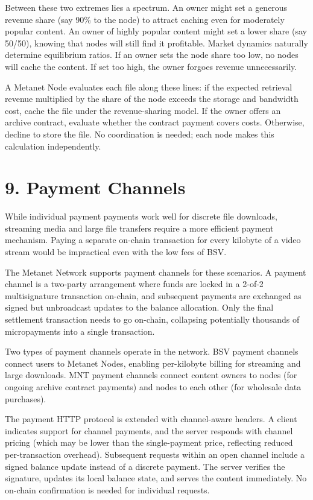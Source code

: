 \documentclass[11pt,a4paper]{article}
\begin{document}
Between these two extremes lies a spectrum. An owner might set a generous revenue share (say 90\% to the node) to attract caching even for moderately popular content. An owner of highly popular content might set a lower share (say 50/50), knowing that nodes will still find it profitable. Market dynamics naturally determine equilibrium ratios. If an owner sets the node share too low, no nodes will cache the content. If set too high, the owner forgoes revenue unnecessarily.

A Metanet Node evaluates each file along these lines: if the expected retrieval revenue multiplied by the share of the node exceeds the storage and bandwidth cost, cache the file under the revenue-sharing model. If the owner offers an archive contract, evaluate whether the contract payment covers costs. Otherwise, decline to store the file. No coordination is needed; each node makes this calculation independently.

\section{9. Payment Channels}

While individual payment payments work well for discrete file downloads, streaming media and large file transfers require a more efficient payment mechanism. Paying a separate on-chain transaction for every kilobyte of a video stream would be impractical even with the low fees of BSV.

The Metanet Network supports payment channels for these scenarios. A payment channel is a two-party arrangement where funds are locked in a 2-of-2 multisignature transaction on-chain, and subsequent payments are exchanged as signed but unbroadcast updates to the balance allocation. Only the final settlement transaction needs to go on-chain, collapsing potentially thousands of micropayments into a single transaction.

Two types of payment channels operate in the network. BSV payment channels connect users to Metanet Nodes, enabling per-kilobyte billing for streaming and large downloads. MNT payment channels connect content owners to nodes (for ongoing archive contract payments) and nodes to each other (for wholesale data purchases).

The payment HTTP protocol is extended with channel-aware headers. A client indicates support for channel payments, and the server responds with channel pricing (which may be lower than the single-payment price, reflecting reduced per-transaction overhead). Subsequent requests within an open channel include a signed balance update instead of a discrete payment. The server verifies the signature, updates its local balance state, and serves the content immediately. No on-chain confirmation is needed for individual requests.
\end{document}
